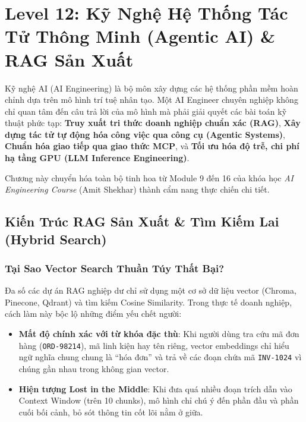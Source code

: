 \chapter{Level 12: Kỹ Nghệ Hệ Thống Tác Tử Thông Minh (Agentic AI) \& RAG Sản Xuất}

\begin{theorybox}
Kỹ nghệ AI (AI Engineering) là bộ môn xây dựng các hệ thống phần mềm hoàn chỉnh dựa trên mô hình trí tuệ nhân tạo. Một AI Engineer chuyên nghiệp không chỉ quan tâm đến câu trả lời của mô hình mà phải giải quyết các bài toán kỹ thuật phức tạp: \textbf{Truy xuất tri thức doanh nghiệp chuẩn xác (RAG)}, \textbf{Xây dựng tác tử tự động hóa công việc qua công cụ (Agentic Systems)}, \textbf{Chuẩn hóa giao tiếp qua giao thức MCP}, và \textbf{Tối ưu hóa độ trễ, chi phí hạ tầng GPU (LLM Inference Engineering)}.

Chương này chuyển hóa toàn bộ tinh hoa từ Module 9 đến 16 của khóa học \textit{AI Engineering Course} (Amit Shekhar) thành cẩm nang thực chiến chi tiết.
\end{theorybox}

\section{Kiến Trúc RAG Sản Xuất \& Tìm Kiếm Lai (Hybrid Search)}

\subsection{Tại Sao Vector Search Thuần Túy Thất Bại?}
Đa số các dự án RAG nghiệp dư chỉ sử dụng một cơ sở dữ liệu vector (Chroma, Pinecone, Qdrant) và tìm kiếm Cosine Similarity. Trong thực tế doanh nghiệp, cách làm này bộc lộ những điểm yếu chết người:
\begin{itemize}
    \item \textbf{Mất độ chính xác với từ khóa đặc thù}: Khi người dùng tra cứu mã đơn hàng (\texttt{ORD-98214}), mã linh kiện hay tên riêng, vector embeddings chỉ hiểu ngữ nghĩa chung chung là ``hóa đơn'' và trả về các đoạn chứa mã \texttt{INV-1024} vì chúng gần nhau trong không gian vector.
    \item \textbf{Hiện tượng Lost in the Middle}: Khi đưa quá nhiều đoạn trích dẫn vào Context Window (trên 10 chunks), mô hình chỉ chú ý đến phần đầu và phần cuối bối cảnh, bỏ sót thông tin cốt lõi nằm ở giữa.
\end{itemize}

